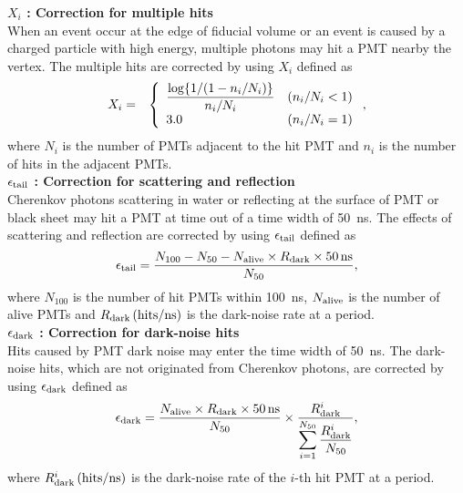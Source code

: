 \textbf{$X_{i}$ : Correction for multiple hits}\\
\hs
When an event occur at the edge of fiducial volume or an event is caused by a charged particle with high energy, multiple photons may hit a PMT nearby the vertex.
The multiple hits are corrected by using $X_{i}$ defined as
\begin{eqnarray}
	X_{i} &=&
	\left\{
	\begin{array}{ll}
		\displaystyle {\log\{1/(1 - n_{i}/N_{i})\} \over n_{i}/N_{i}} & (n_{i}/N_{i} < 1) \\
		3.0                                                           & (n_{i}/N_{i} = 1)
	\end{array} \right.,
\end{eqnarray}
where $N_{i}$ is the number of PMTs adjacent to the hit PMT and $n_{i}$ is the number of hits in the adjacent PMTs.\\

\textbf{$\epsilon_{\rm tail}$ : Correction for scattering and reflection}\\
\hs
Cherenkov photons scattering in water or reflecting at the surface of PMT or black sheet may hit a PMT at time out of a time width of 50~ns.
The effects of scattering and reflection are corrected by using $\epsilon_{\rm tail}$ defined as
\begin{eqnarray}
	\epsilon_{\rm tail} = {N_{100} - N_{50} - N_{\rm alive} \times R_{\rm dark} \times 50\,{\rm ns} \over N_{50}},
\end{eqnarray}
where $N_{100}$ is the number of hit PMTs within 100~ns, $N_{\rm alive}$ is the number of alive PMTs and $R_{\rm dark}\,({\rm hits}/{\rm ns})$ is the dark-noise rate at a period.\\

\textbf{$\epsilon_{\rm dark}$ : Correction for dark-noise hits}\\
\hs
Hits caused by PMT dark noise may enter the time width of 50~ns.
The dark-noise hits, which are not originated from Cherenkov photons, are corrected by using $\epsilon_{\rm dark}$ defined as
\begin{eqnarray}
	\epsilon_{\rm dark} = {N_{\rm alive}\times R_{\rm dark} \times 50\,{\rm ns} \over N_{50}} \times {R_{\rm dark}^{i} \over \displaystyle \sum_{i=1}^{N_{50}} {R_{\rm dark}^{i} \over N_{50}}},
\end{eqnarray}
where $R_{\rm dark}^{i}\,({\rm hits}/{\rm ns})$ is the dark-noise rate of the $i$-th hit PMT at a period.\\

